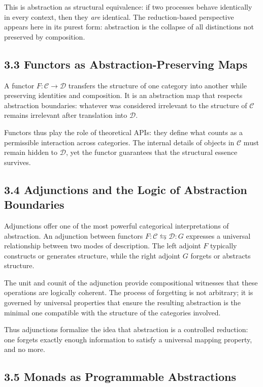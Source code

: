\documentclass[12pt,letterpaper]{article}
\theoremstyle{remark}
\begin{document}
This is abstraction as structural equivalence: if two processes behave identically in every context, then they \emph{are} identical. The reduction-based perspective appears here in its purest form: abstraction is the collapse of all distinctions not preserved by composition.

\subsection{3.3 Functors as Abstraction-Preserving Maps}

A functor \(F : \mathcal{C} \to \mathcal{D}\) transfers the structure of one category into another while preserving identities and composition. It is an abstraction map that respects abstraction boundaries: whatever was considered irrelevant to the structure of \(\mathcal{C}\) remains irrelevant after translation into \(\mathcal{D}\).

Functors thus play the role of theoretical APIs: they define what counts as a permissible interaction across categories. The internal details of objects in \(\mathcal{C}\) must remain hidden to \(\mathcal{D}\), yet the functor guarantees that the structural essence survives.

\subsection{3.4 Adjunctions and the Logic of Abstraction Boundaries}

Adjunctions offer one of the most powerful categorical interpretations of abstraction. An adjunction between functors \(F : \mathcal{C} \leftrightarrows \mathcal{D} : G\) expresses a universal relationship between two modes of description. The left adjoint \(F\) typically constructs or generates structure, while the right adjoint \(G\) forgets or abstracts structure.

The unit and counit of the adjunction provide compositional witnesses that these operations are logically coherent. The process of forgetting is not arbitrary; it is governed by universal properties that ensure the resulting abstraction is the minimal one compatible with the structure of the categories involved.

Thus adjunctions formalize the idea that abstraction is a controlled reduction: one forgets exactly enough information to satisfy a universal mapping property, and no more.

\subsection{3.5 Monads as Programmable Abstractions}
\end{document}
